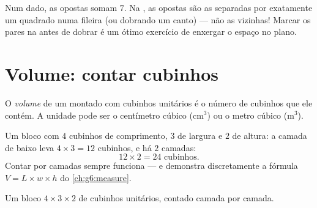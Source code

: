 \begin{example}\label{ex:g5:solids:read}
Num dado, as  opostas somam $7$. Na , as 
opostas são as separadas por exatamente um quadrado numa fileira (ou
dobrando um canto) --- não as vizinhas! Marcar os pares na
 antes de dobrar é um ótimo exercício de enxergar o
espaço no plano.
\end{example}

\section{Volume: contar cubinhos}

\begin{definition}\label{def:g5:solids:volume}
O \emph{volume} de um  montado com cubinhos
unitários é o número de cubinhos que ele contém. A unidade pode ser o
centímetro cúbico (cm$^3$) ou o metro cúbico (m$^3$).
\end{definition}

\begin{example}\label{ex:g5:solids:layers}
Um bloco com $4$ cubinhos de comprimento, $3$ de largura e $2$ de
altura: a camada de baixo leva $4 \times 3 = 12$ cubinhos, e há $2$
camadas:
\[
12 \times 2 = 24 \text{ cubinhos} .
\]
Contar por camadas sempre funciona --- e demonstra discretamente a
fórmula $V = L \times w \times h$ do \cref{ch:g6:measure}.
\end{example}

\begin{omfigure}

{\small Um bloco $4 \times 3 \times 2$ de cubinhos unitários, contado
camada por camada.}
\end{omfigure}

